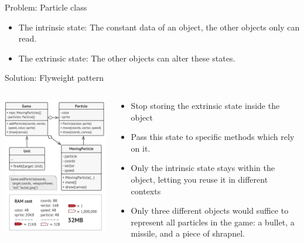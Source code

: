 \documentclass[13pt]{beamer}
\begin{document}
\begin{frame}{Problem: Particle class}
	\begin{itemize}
		\item The intrinsic state: The constant data of an object, the other objects only can read.
		\item The extrinsic state: The other objects can alter these states.
	\end{itemize}
\end{frame}

\begin{frame}{Solution: Flyweight pattern}
	\begin{columns}[T]
		\begin{column}{.5\textwidth}
			\includegraphics[scale=0.37]{./images/solution.png}
		\end{column}
	
		\begin{column}{.5\textwidth}
			\begin{itemize}
				\item Stop storing the extrinsic state inside the object
				\item Pass this state to specific methods which rely on it.
				\item Only the intrinsic state stays within the object, letting you reuse it in different contexts
				\item Only three different objects would suffice to represent all particles in the game: a bullet, a missile, and a piece of shrapnel.
			\end{itemize}
		\end{column}
	\end{columns}
\end{frame}
\end{document}
